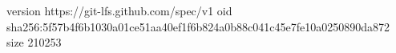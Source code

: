 version https://git-lfs.github.com/spec/v1
oid sha256:5f57b4f6b1030a01ce51aa40ef1f6b824a0b88c041c45e7fe10a0250890da872
size 210253
